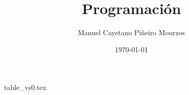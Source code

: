 \documentclass[a4paper,twoside,titlepage]{scrartcl}
\title{Programación}
\author{Manuel Cayetano Piñeiro Mourzos}
\date{\today}
\begin{document}
{table_vs0.tex}
    
\end{document}
